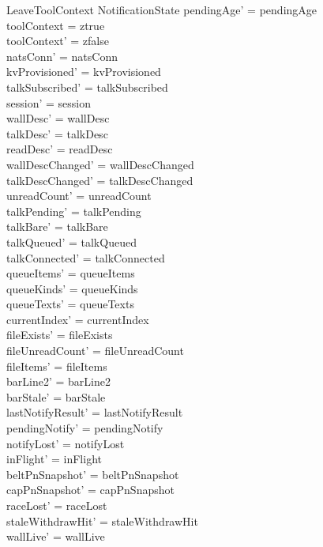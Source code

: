 \documentclass[a4paper,10pt,fleqn]{article}
\begin{document}
\begin{schema}{LeaveToolContext}
  \Delta NotificationState
  \where
  pendingAge' = pendingAge \\
  toolContext = ztrue \\
  toolContext' = zfalse \\
  natsConn' = natsConn \\
  kvProvisioned' = kvProvisioned \\
  talkSubscribed' = talkSubscribed \\
  session' = session \\
  wallDesc' = wallDesc \\
  talkDesc' = talkDesc \\
  readDesc' = readDesc \\
  wallDescChanged' = wallDescChanged \\
  talkDescChanged' = talkDescChanged \\
  unreadCount' = unreadCount \\
  talkPending' = talkPending \\
  talkBare' = talkBare \\
  talkQueued' = talkQueued \\
  talkConnected' = talkConnected \\
  queueItems' = queueItems \\
  queueKinds' = queueKinds \\
  queueTexts' = queueTexts \\
  currentIndex' = currentIndex \\
  fileExists' = fileExists \\
  fileUnreadCount' = fileUnreadCount \\
  fileItems' = fileItems \\
  barLine2' = barLine2 \\
  barStale' = barStale \\
  lastNotifyResult' = lastNotifyResult \\
  pendingNotify' = pendingNotify \\
  notifyLost' = notifyLost \\
  inFlight' = inFlight \\
  beltPnSnapshot' = beltPnSnapshot \\
  capPnSnapshot' = capPnSnapshot \\
  raceLost' = raceLost \\
  staleWithdrawHit' = staleWithdrawHit \\
  wallLive' = wallLive \\

\end{schema}
\end{document}
